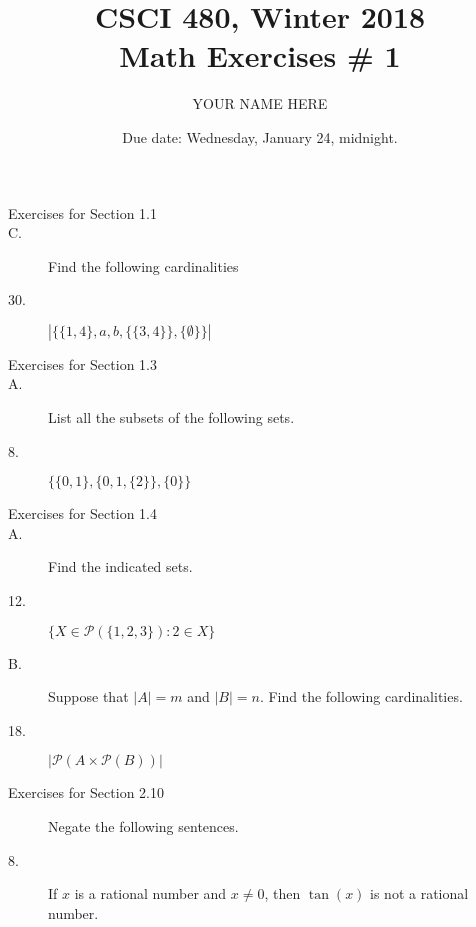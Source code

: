 \documentclass{article}
\title{CSCI 480, Winter 2018\\Math Exercises \# 1}
\author{YOUR NAME HERE}
\date{Due date:  Wednesday, January 24, midnight.}
\begin{document}
\maketitle

\begin{description}
\item[Exercises for Section 1.1]
\item[C.] Find the following cardinalities
\item[30.] $|\{\{1,4\},a,b,\{\{3,4\}\},\{\emptyset\}\}|$

\item[Exercises for Section 1.3]
\item[A.] List all the subsets of the following sets.
\item[8.] $\{\{0,1\},\{0,1,\{2\}\},\{0\}\}$

\item[Exercises for Section 1.4]
\item[A.] Find the indicated sets.
\item[12.] $\{X\in\mathcal{P}(\{1,2,3\}):2\in X\}$
\item[B.] Suppose that $|A|=m$ and $|B|=n$.  Find the following cardinalities.
\item[18.] $|\mathcal{P}(A\times \mathcal{P}(B))|$

\item[Exercises for Section 2.10]  Negate the following sentences.


\item[8.] If $x$ is a rational number and $x\not = 0$, then
  $\tan(x)$ is not a rational number.
  

\end{description}
\end{document}
